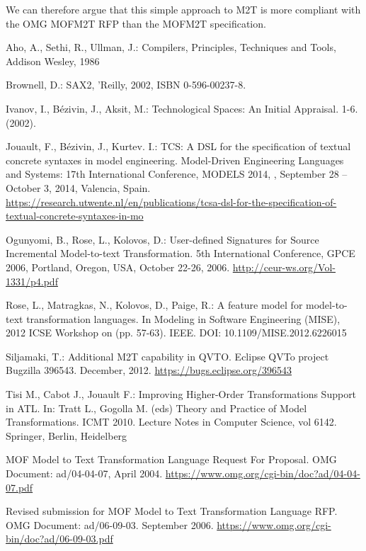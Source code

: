 \documentclass{llncs}
\begin{document}
We can therefore argue that this simple approach to M2T is more compliant with the OMG MOFM2T RFP than the MOFM2T specification.


%
\begin{thebibliography}{}
%
Aho, A., Sethi, R., Ullman, J.: Compilers, Principles, Techniques and Tools, Addison Wesley, 1986

Brownell, D.: SAX2, 'Reilly, 2002, ISBN 0-596-00237-8.

Ivanov, I., B\'ezivin, J., Aksit, M.: Technological Spaces: An Initial Appraisal. 1-6.  (2002). 

Jouault, F.,  B\'ezivin, J.,  Kurtev. I.: TCS: A DSL for the specification of textual concrete syntaxes in model engineering. Model-Driven Engineering Languages and Systems: 17th International Conference, MODELS 2014, , September 28 – October 3, 2014, Valencia, Spain.
\url{https://research.utwente.nl/en/publications/tcsa-dsl-for-the-specification-of-textual-concrete-syntaxes-in-mo}

Ogunyomi, B., Rose, L., Kolovos, D.: User-defined Signatures for Source Incremental Model-to-text Transformation. 5th International Conference, GPCE 2006, Portland, Oregon, USA, October 22-26, 2006.
\url{http://ceur-ws.org/Vol-1331/p4.pdf}

Rose, L., Matragkas, N., Kolovos, D.,  Paige, R.: A feature model for model-to-text transformation languages. In Modeling in Software Engineering (MISE), 2012 ICSE Workshop on (pp. 57-63). IEEE. DOI: 10.1109/MISE.2012.6226015

Siljamaki, T.: Additional M2T capability in QVTO. Eclipse QVTo project Bugzilla 396543. December, 2012.
\url{https://bugs.eclipse.org/396543}

 Tisi M., Cabot J., Jouault F.: Improving Higher-Order Transformations Support in ATL. In: Tratt L., Gogolla M. (eds) Theory and Practice of Model Transformations. ICMT 2010. Lecture Notes in Computer Science, vol 6142. Springer, Berlin, Heidelberg

MOF Model to Text Transformation Language Request For Proposal. OMG Document: ad/04-04-07, April 2004.
\url{https://www.omg.org/cgi-bin/doc?ad/04-04-07.pdf}

Revised submission for MOF Model to Text Transformation Language RFP. OMG Document: ad/06-09-03. September 2006.
\url{https://www.omg.org/cgi-bin/doc?ad/06-09-03.pdf}


\end{thebibliography}
\end{document}
